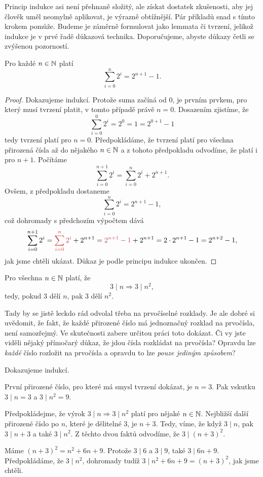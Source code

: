 Princip indukce asi není přehnaně složitý, ale získat dostatek zkušenosti, aby
jej člověk uměl neomylně aplikovat, je výrazně obtížnější. Pár příkladů snad s
tímto krokem pomůže. Budeme je záměrně formulovat jako lemmata či tvrzení,
jelikož indukce je v prvé řadě důkazová technika. Doporučujeme, abyste důkazy
četli se zvýšenou pozorností.

\begin{lemma}
 Pro každé $n \in \mathbb{N}$ platí
 \[
  \sum_{i=0}^{n} 2^{i} = 2^{n+1} - 1.
 \]
\end{lemma}
\begin{proof}
 Dokazujeme indukcí. Protože suma začíná od $0$, je prvním prvkem, pro který
 musí tvrzení platit, v tomto případě právě $n = 0$. Dosazením zjistíme, že
 \[
  \sum_{i=0}^{0} 2^{i} = 2^{0} = 1 = 2^{0 + 1} - 1
 \]
 tedy tvrzení platí pro $n = 0$. Předpokládáme, že tvrzení platí pro všech\-na
 přirozená čísla až do nějakého $n \in \mathbb{N}$ a z tohoto předpokladu odvodíme, že
 platí i pro $n + 1$. Počítáme
 \[
  \sum_{i=0}^{n + 1} 2^{i} = \sum_{i=0}^{n} 2^{i} + 2^{n+1}.
 \]
 Ovšem, z předpokladu dostaneme
 \[
  \sum_{i=0}^{n} 2^{i} = 2^{n+1}-1,
 \]
 což dohromady s předchozím výpočtem dává
 \[
  \sum_{i=0}^{n + 1} 2^{i} = \clr{\sum_{i=0}^{n} 2^{i}} + 2^{n+1} = \clr{2^{n +
  1} - 1} + 2^{n+1} = 2 \cdot 2^{n+1} - 1 = 2^{n+2} - 1,
 \]
 jak jsme chtěli ukázat. Důkaz je podle principu indukce ukončen.
\end{proof}

\begin{lemma}
 \label{lemma:deleni-trojkou}
 Pro všechna $n \in \mathbb{N}$ platí, že
 \[
  3 \mid n \Rightarrow 3 \mid n^2,
 \]
 tedy, pokud $3$ dělí $n$, pak $3$ dělí $n^2$.
\end{lemma}
Tady by se jistě leckdo rád odvolal třeba na prvočíselné rozklady. Je ale dobré
si uvědomit, že fakt, že každé přirozené číslo má jednoznačný rozklad na
prvočísla, není samozřejmý. Ve skutečnosti zabere určitou práci toto dokázat. Či
vy jste viděli nějaký přímočarý důkaz, že jdou čísla rozkládat na prvočísla?
Opravdu lze \emph{každé} číslo rozložit na prvočísla a opravdu to lze
\emph{pouze jediným způsobem}?

\begin{enhproof}
 Dokazujeme indukcí.

 První přirozené číslo, pro které má smysl tvrzení dokázat, je $n = 3$. Pak
 vskutku $3 \mid n = 3$ a $3 \mid n^2 = 9$.

 Předpokládejme, že výrok $3 \mid n \Rightarrow 3 \mid n^2$ platí pro nějaké
 $n \in \mathbb{N}$. Nejbližší další přirozené číslo po $n$, které je dělitelné $3$, je
 $n + 3$. Tedy, víme, že když $3 \mid n$, pak $3 \mid n + 3$ a také $3 \mid
 n^2$. Z těchto dvou faktů odvodíme, že $3 \mid (n+3)^2$.

 Máme $(n + 3)^2 = n^2 + 6n + 9$. Protože $3 \mid 6$ a $3 \mid 9$, také $3 \mid
 6n + 9$. Předpokládáme, že $3 \mid n^2$, dohromady tudíž $3 \mid n^2 + 6n + 9 =
 (n+3)^2$, jak jsme chtěli.
\end{enhproof}

